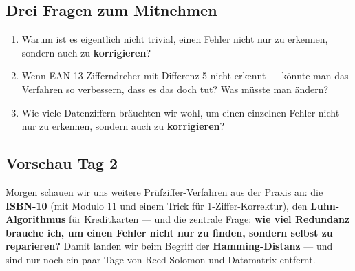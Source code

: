\subsection*{Drei Fragen zum Mitnehmen}

\begin{enumerate}
\item Warum ist es eigentlich nicht trivial, einen Fehler nicht nur zu
  erkennen, sondern auch zu \textbf{korrigieren}?
\item Wenn EAN-13 Zifferndreher mit Differenz 5 nicht erkennt — könnte
  man das Verfahren so verbessern, dass es das doch tut? Was müsste
  man ändern?
\item Wie viele Datenziffern bräuchten wir wohl, um einen einzelnen
  Fehler nicht nur zu erkennen, sondern auch zu \textbf{korrigieren}?
\end{enumerate}

\subsection*{Vorschau Tag 2}

Morgen schauen wir uns weitere Prüfziffer-Verfahren aus der Praxis an:
die \textbf{ISBN-10} (mit Modulo 11 und einem Trick für
1-Ziffer-Korrektur), den \textbf{Luhn-Algorithmus} für Kreditkarten
— und die zentrale Frage: \textbf{wie viel Redundanz brauche ich, um
einen Fehler nicht nur zu finden, sondern selbst zu reparieren?} Damit
landen wir beim Begriff der \textbf{Hamming-Distanz} — und sind nur
noch ein paar Tage von Reed-Solomon und Datamatrix entfernt.

